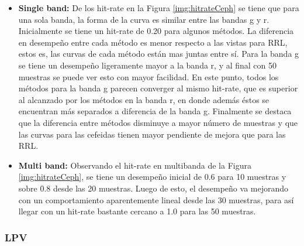     	\begin{itemize}
    	    \item \textbf{Single band:} De los hit-rate en la Figura \ref{img:hitrateCeph} se tiene que para una sola banda, la forma de la curva es similar entre las bandas g y r. Inicialmente se tiene un hit-rate de 0.20 para algunos métodos. La diferencia en desempeño entre cada método es menor respecto a las vistas para RRL, estos es, las curvas de cada método están mas juntas entre sí. Para la banda g se tiene un desempeño ligeramente mayor a la banda r, y al final con 50 muestras se puede ver esto con mayor facilidad. En este punto, todos los métodos para la banda g parecen converger al mismo hit-rate, que es superior al alcanzado por los métodos en la banda r, en donde además éstos se encuentran más separados a diferencia de la banda g. Finalmente se destaca que la diferencia entre métodos disminuye a mayor número de muestras y que las curvas para las cefeidas tienen mayor pendiente de mejora que para las RRL.
    	    
    	    \item \textbf{Multi band:} Observando el hit-rate en multibanda de la Figura \ref{img:hitrateCeph}, se tiene un desempeño inicial de 0.6 para 10 muestras y sobre 0.8 desde las 20 muestras. Luego de esto, el desempeño va mejorando con un comportamiento aparentemente lineal desde las 30 muestras, para así llegar con un hit-rate bastante cercano a 1.0 para las 50 muestras.
    	\end{itemize}
    	
	    \subsubsection{LPV}
    	

